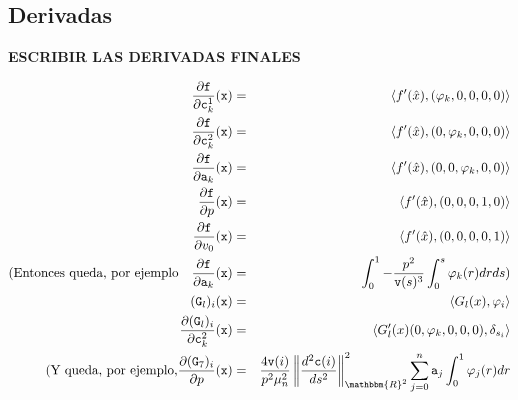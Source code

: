 \documentclass[a4paper,10pt]{book}
\newcommand{\R}{\mathbbm{R}}
\newcounter{ejem}[section]
\begin{document}
\subsection{Derivadas}

\textbf{ESCRIBIR LAS DERIVADAS FINALES}

\begin{eqnarray*}
\frac{\partial \texttt{f}}{\partial \texttt{c}^1_k}(\texttt{x})&=&\langle f'(\hat x) , (\varphi_k,0,0,0,0)\rangle\\
\frac{\partial \texttt{f}}{\partial \texttt{c}^2_k}(\texttt{x})&=&\langle f'(\hat x) , (0,\varphi_k,0,0,0)\rangle\\
\frac{\partial \texttt{f}}{\partial \texttt{a}_k}(\texttt{x})&=&\langle f'(\hat x) , (0,0,\varphi_k,0,0)\rangle\\
\frac{\partial \texttt{f}}{\partial p}(\texttt{x})&=&\langle f'(\hat x) , (0,0,0,1,0)\rangle\\
\frac{\partial \texttt{f}}{\partial v_0}(\texttt{x})&=&\langle f'(\hat x) , (0,0,0,0,1)\rangle\\
(\mbox{Entonces queda, por ejemplo} \quad\frac{\partial \texttt{f}}{\partial \texttt{a}_k}(\texttt{x})&=&\int^1_0-\frac{p^2}{\texttt{v}(s)^3}\int^s_0\varphi_k(r)dr ds)\\
(\texttt{G}_l)_i(\texttt{x})&=&\langle G_l(x) , \varphi_i\rangle\\
\frac{\partial(\texttt{G}_l)_i}{\partial\texttt{c}^2_k}(\texttt{x})&=&\langle G'_l(x)(0,\varphi_k,0,0,0) , \delta_{s_i}\rangle\\
(\mbox{Y queda, por ejemplo,}\frac{\partial(\texttt{G}_7)_i}{\partial p}(\texttt{x})&=&\frac{4\texttt{v}(i)}{p^2\mu_n^2}\left\|\frac{d^2\texttt{c}(i)}{ds^2}\right\|_{\R^2}^2\sum_{j=0}^n\texttt{a}_j\int^1_0\varphi_j(r)dr
\end{eqnarray*}
\end{document}
